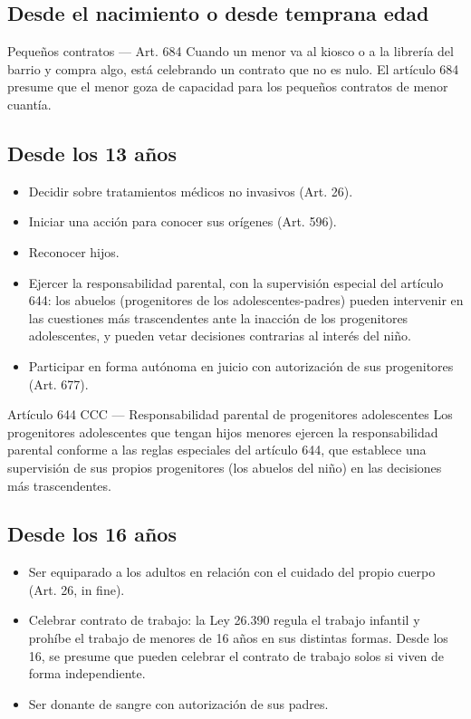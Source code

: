 \documentclass[12pt,oneside]{book}
\begin{document}
\subsection{Desde el nacimiento o desde temprana edad}

\begin{example}{Pequeños contratos — Art. 684}
Cuando un menor va al kiosco o a la librería del barrio y compra algo, está celebrando un contrato que no es nulo. El artículo 684 presume que el menor goza de capacidad para los pequeños contratos de menor cuantía.
\end{example}

\subsection{Desde los 13 años}

\begin{itemize}
    \item Decidir sobre tratamientos médicos no invasivos (Art. 26).
    \item Iniciar una acción para conocer sus orígenes (Art. 596).
    \item Reconocer hijos.
    \item Ejercer la responsabilidad parental, con la supervisión especial del artículo 644: los abuelos (progenitores de los adolescentes-padres) pueden intervenir en las cuestiones más trascendentes ante la inacción de los progenitores adolescentes, y pueden vetar decisiones contrarias al interés del niño.
    \item Participar en forma autónoma en juicio con autorización de sus progenitores (Art. 677).
\end{itemize}

\begin{definition}{Artículo 644 CCC — Responsabilidad parental de progenitores adolescentes}
Los progenitores adolescentes que tengan hijos menores ejercen la responsabilidad parental conforme a las reglas especiales del artículo 644, que establece una supervisión de sus propios progenitores (los abuelos del niño) en las decisiones más trascendentes.
\end{definition}

\subsection{Desde los 16 años}

\begin{itemize}
    \item Ser equiparado a los adultos en relación con el cuidado del propio cuerpo (Art. 26, in fine).
    \item Celebrar contrato de trabajo: la Ley 26.390 regula el trabajo infantil y prohíbe el trabajo de menores de 16 años en sus distintas formas. Desde los 16, se presume que pueden celebrar el contrato de trabajo solos si viven de forma independiente.
    \item Ser donante de sangre con autorización de sus padres.
\end{itemize}
\end{document}
